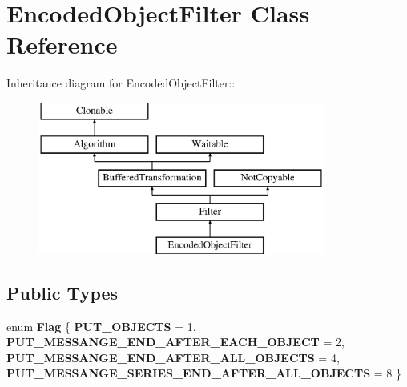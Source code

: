 \hypertarget{class_encoded_object_filter}{
\section{EncodedObjectFilter Class Reference}
\label{class_encoded_object_filter}
}
Inheritance diagram for EncodedObjectFilter::\begin{figure}[H]
\begin{center}
\leavevmode
\includegraphics[height=5cm]{class_encoded_object_filter}
\end{center}
\end{figure}
\subsection*{Public Types}
\begin{DoxyCompactItemize}
\item 
enum {\bfseries Flag} \{ {\bfseries PUT\_\-OBJECTS} = 1, 
{\bfseries PUT\_\-MESSANGE\_\-END\_\-AFTER\_\-EACH\_\-OBJECT} = 2, 
{\bfseries PUT\_\-MESSANGE\_\-END\_\-AFTER\_\-ALL\_\-OBJECTS} = 4, 
{\bfseries PUT\_\-MESSANGE\_\-SERIES\_\-END\_\-AFTER\_\-ALL\_\-OBJECTS} = 8
 \}
\end{DoxyCompactItemize}

